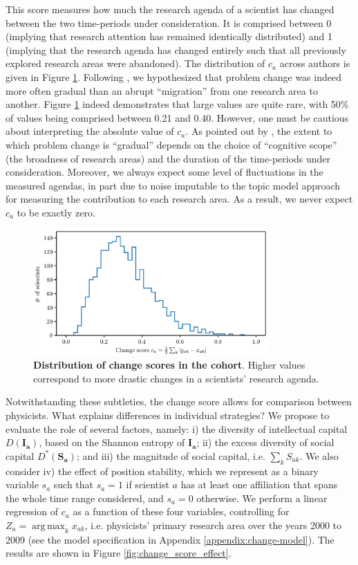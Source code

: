 \documentclass{article}
\DeclareMathOperator*{\argmax}{arg\,max}
\begin{document}
This score measures how much the research agenda of a scientist has changed between the two time-periods under consideration. It is comprised between 0 (implying that research attention has remained identically distributed) and 1 (implying that the research agenda has changed entirely such that all previously explored research areas were abandoned). The distribution of $c_a$ across authors is given in Figure \ref{fig:change_scores}. Following \citet{Gieryn1978}, we hypothesized that problem change was indeed more often gradual than an abrupt ``migration'' from one research area to another. Figure \ref{fig:change_scores} indeed demonstrates that large values are quite rare, with 50\% of values being comprised between 0.21 and 0.40. However, one must be cautious about interpreting the absolute value of $c_a$. As pointed out by \citet{Gieryn1978}, the extent to which problem change is ``gradual'' depends on the choice of ``cognitive scope'' (the broadness of research areas) and the duration of the time-periods under consideration.  Moreover, we always expect some level of fluctuations in the measured agendas, in part due to noise imputable to the topic model approach for measuring the contribution to each research area. As a result, we never expect $c_a$ to be exactly zero.

\begin{figure}[h]
    \centering
        \includegraphics[width=0.8\textwidth]{plots/change_score.eps}
    \caption{\textbf{Distribution of change scores in the cohort}. Higher values correspond to more drastic changes in a scientists' research agenda.}    
    \label{fig:change_scores}
\end{figure}

Notwithstanding these subtleties, the change score allows for comparison between physicists. What explains differences in individual strategies? We propose to evaluate the role of several factors, namely: i) the diversity of intellectual capital $D(\bm{I_a})$, based on the Shannon entropy of $\bm{I_a}$; ii) the excess diversity of social capital $D^{\ast}(\bm{S_a})$; and iii) the magnitude of social capital, i.e. $\sum_k S_{ak}$. We also consider iv) the effect of position stability, which we represent as a binary variable $s_a$ such that $s_a=1$ if scientist $a$ has at least one affiliation that spans the whole time range considered, and $s_a=0$ otherwise. We perform a linear regression of $c_a$ as a function of these four variables, controlling for $Z_a=\argmax_{k} x_{ak}$, i.e. physicists' primary research area over the years 2000 to 2009 (see the model specification in Appendix \ref{appendix:change-model}). The results are shown in Figure \ref{fig:change_score_effect}.
\end{document}
